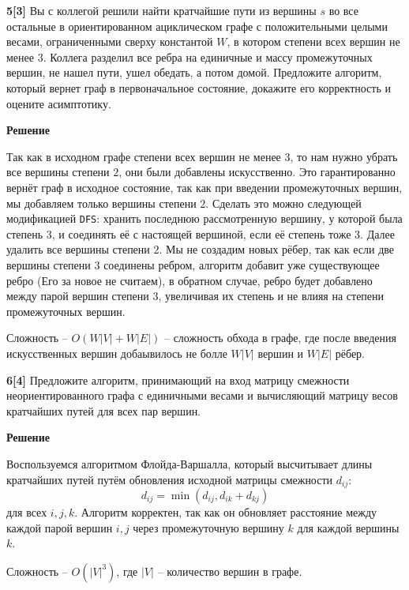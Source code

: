 \documentclass{article}
\begin{document}
\medskip

\textbf{5[3]} Вы с коллегой решили найти кратчайшие пути из вершины $s$ во все остальные в ориентированном ациклическом графе с положительными целыми весами, ограниченными сверху константой $W$, в котором степени всех вершин не менее $3$. Коллега разделил все ребра на единичные и массу промежуточных вершин, не нашел пути, ушел обедать, а потом домой. Предложите алгоритм, который вернет граф в первоначальное состояние, докажите его корректность и оцените асимптотику.

\medskip

\textbf{Решение}

\medskip

Так как в исходном графе степени всех вершин не менее $3$,
то нам нужно убрать все вершины степени $2$, они были добавлены искусственно.
Это гарантированно вернёт граф в исходное состояние, так как при введении
промежуточных вершин, мы добавляем только вершины степени $2$. Сделать
это можно следующей модификацией \texttt{DFS}: хранить последнюю
рассмотренную вершину, у которой была степень $3$, и соединять её
с настоящей вершиной, если её степень тоже $3$. Далее удалить все вершины
степени $2$. Мы не создадим новых рёбер, так как если две вершины
степени $3$ соединены ребром, алгоритм добавит уже существующее ребро
(Его за новое не считаем), в обратном случае, ребро будет добавлено
между парой вершин степени $3$, увеличивая их степень и не влияя на степени
промежуточных вершин.

Сложность -- $O(W|V| + W|E|)$ -- сложность обхода в графе,
где после введения искусственных вершин добаывилось не болле $W|V|$ вершин и
$W|E|$ рёбер.

\medskip

\textbf{6[4]} Предложите алгоритм, принимающий на вход матрицу смежности неориентированного графа с единичными весами и вычисляющий матрицу весов кратчайших путей для всех пар вершин.

\medskip

\textbf{Решение}

\medskip

Воспользуемся алгоритмом Флойда-Варшалла, который высчитывает
длины кратчайших путей путём обновления исходной матрицы смежности
$d_{ij}$:
\[
	d_{ij} = \min(d_{ij}, d_{ik} + d_{kj})
\]
для всех $i, j, k$. Алгоритм корректен, так как он обновляет
расстояние между каждой парой вершин $i, j$ через промежуточную
вершину $k$ для каждой вершины $k$.

Сложность -- $O(|V|^3)$, где $|V|$ -- количество вершин в графе.
\end{document}
